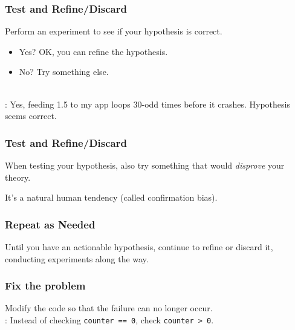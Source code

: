 \begin{frame}
\frametitle{Test and Refine/Discard}

\begin{changemargin}{1cm}
\Large
Perform an experiment to see if your hypothesis is correct.

\large
\begin{itemize}
\item Yes? OK, you can refine the hypothesis.
\item No? Try something else.
\end{itemize}
~\\

: Yes, feeding 1.5 to my app loops 30-odd times
before it crashes. Hypothesis seems correct.

\end{changemargin}

\end{frame}

\begin{frame}
\frametitle{Test and Refine/Discard}
\begin{changemargin}{1cm}
\Large
When testing your hypothesis, also try something that would \emph{disprove} your theory.

It's a natural human tendency (called confirmation bias).
\end{changemargin}

\end{frame}


\begin{frame}
\frametitle{Repeat as Needed}

\begin{changemargin}{1cm}

\Large
Until you have an actionable hypothesis, continue to refine or
discard it, conducting experiments along the way.

\end{changemargin}

\end{frame}

\begin{frame}
\frametitle{Fix the problem}

\begin{changemargin}{1cm}
\Large
Modify the code so that the failure can no longer occur.\\[1em]

\large
{}: Instead of checking {\tt counter == 0},
check {\tt counter > 0}.
\end{changemargin}

\end{frame}


